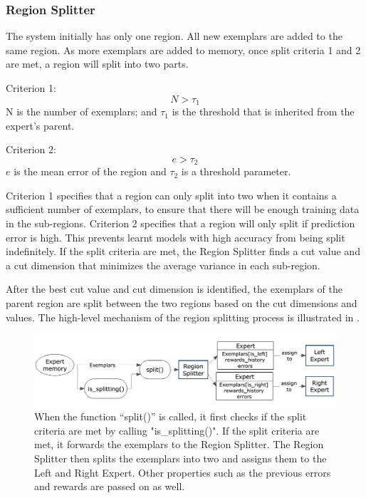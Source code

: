 \FloatBarrier
\subsubsection{Region Splitter}

The system initially has only one region. All new exemplars are added to the same region. As more exemplars are added to memory, once split criteria 1 and 2 are met, a region will split into two parts.

Criterion 1: 
\begin{equation}\label{eqn:split-criterion1}
	N>\tau_1
\end{equation}
N is the number of exemplars; and $\tau_1$ is the threshold that is inherited from the expert's parent. 

Criterion 2:	
\begin{equation}\label{eqn:split-criterion2}
	 e>\tau_2
\end{equation}	
$e$ is the mean error of the region and $\tau_2$ is a threshold parameter. 

Criterion 1 specifies that a region can only split into two when it contains a sufficient number of exemplars, to ensure that there will be enough training data in the sub-regions. Criterion 2 specifies that a region will only split if prediction error is high. This prevents learnt models with high accuracy from being split indefinitely. 
If the split criteria are met, the Region Splitter finds a cut value and a cut dimension that minimizes the average variance in each sub-region. 


After the best cut value and cut dimension is identified, the exemplars of the parent region are split between the two regions based on the cut dimensions and values. The high-level mechanism of the region splitting process is illustrated in .

\begin{figure}[!htbp]
	\centering
	\includegraphics[width=1.0 \textwidth]{"fig/cbla/Block Diagram RegionSplitter"}
	\caption[Block diagram of the Region Splitter]{When the function “split()” is called, it first checks if the split criteria are met by calling "is\_splitting()". If the split criteria are met, it forwards the exemplars to the Region Splitter. The Region Splitter then splits the exemplars into two and assigns them to the Left and Right Expert. Other properties such as the previous errors and rewards are passed on as well. }
	\label{fig:Block Diagram RegionSplitter}
\end{figure}

